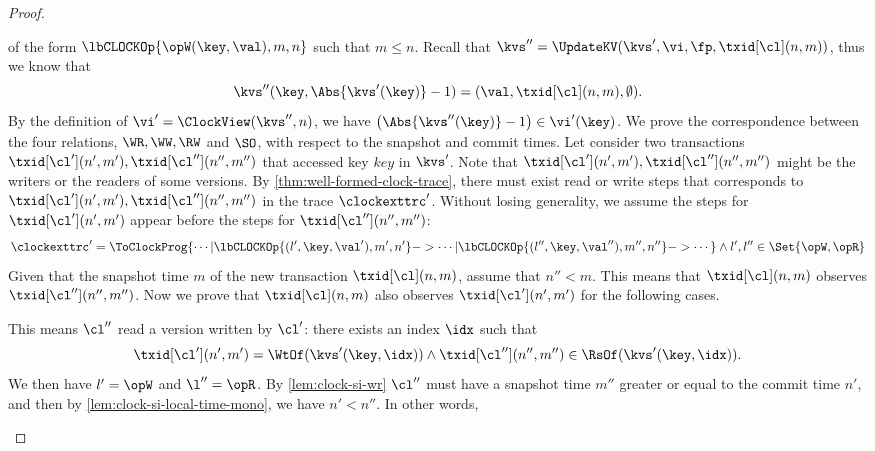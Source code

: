 \begin{proof}
\begin{enumerate}
\begin{enumerate}
        of the form \( \lbCLOCKOp{\opW(\key, \allowbreak \val),m,n}\) such that \( m \leq n \).
        Recall that \( \kvs'' =  \UpdateKV(\kvs',\vi,\fp,\txid[\cl](n,m) ) \),
        thus we know that 
        \[
            \kvs''(\key,\Abs{\kvs'(\key)} - 1) = (\val,\txid[\cl](n,m),\emptyset) .
        \]
        By the definition of \( \vi' = \ClockView(\kvs'',n) \),
        we have \( \left( \Abs{\kvs''(\key)} - 1 \right) \in \vi'(\key) \).
        We prove the correspondence between the four relations, \( \WR, \allowbreak \WW, \allowbreak \RW \) and \( \SO\),
        with respect to the snapshot and commit times.
        Let consider two transactions \( \txid[\cl'](n',m'),\txid[\cl''](n'',m'') \) that accessed key \(key\) in \( \kvs' \).
        Note that \( \txid[\cl'](n',m'),\txid[\cl''](n'',m'') \) might be the writers or the readers of some versions.
        By \cref{thm:well-formed-clock-trace},
        there must exist read or write steps 
        that corresponds to \( \txid[\cl'](n',m'),\txid[\cl''](n'',m'') \) in the trace \( \clockexttrc' \).  
        Without losing generality, we assume the steps for \( \txid[\cl'](n',m') \) 
        appear before the steps for \( \txid[\cl''](n'',m'') \):
        \[
            \clockexttrc' = \ToClockProg{\cdots | \lbCLOCKOp{(l',\key,\val'),m',n'} 
                        -> \cdots | \lbCLOCKOp{(l'',\key,\val''),m'',n''} -> \cdots }
            \land l',l'' \in \Set{\opW,\opR}
        \]
        Given that the snapshot time \( m\) of the new transaction \( \txid[\cl](n,m) \),
        assume that \( n'' < m \).
        This means that \( \txid[\cl](n,m) \) observes \( \txid[\cl''](n'',m'') \).
        Now we prove that \( \txid[\cl](n,m) \) also observes \( \txid[\cl'](n',m') \)
        for the following cases.
        \begin{enumerate}
            This means \( \cl'' \) read a version written by \( \cl' \):
            there exists an index \( \idx \) such that
            \[
                \txid[\cl'](n',m')  = \WtOf(\kvs'(\key,\idx))
                \land \txid[\cl''](n'',m'')  \in \RsOf(\kvs'(\key,\idx)) .
            \]
            We then have \( l' = \opW \) and \( \l'' = \opR \).
            By \cref{lem:clock-si-wr}
            \( \cl'' \) must have a snapshot time \( m'' \) greater or equal to the commit time \( n' \),
            and then by \cref{lem:clock-si-local-time-mono}, we have \( n' < n'' \).
            In other words,

\end{enumerate}
\end{enumerate}
\end{enumerate}
\end{proof}
